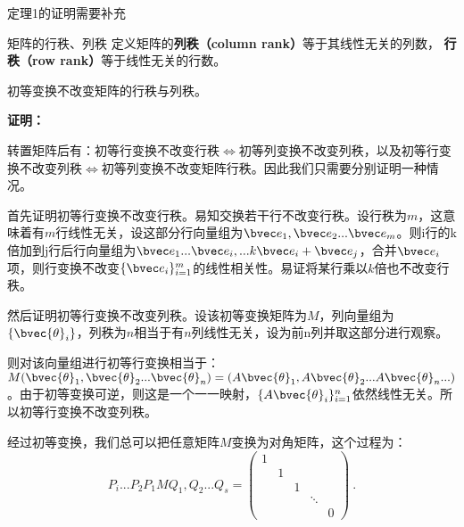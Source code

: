
\begin{issues}
\issueDraft 定理1的证明需要补充
\end{issues}


\begin{definition}{矩阵的行秩、列秩}
定义矩阵的\textbf{列秩（column rank）}等于其线性无关的列数， \textbf{行秩（row rank）}等于线性无关的行数。
\end{definition}
\begin{theorem}{}
初等变换不改变矩阵的行秩与列秩。
\end{theorem}
\textbf{证明：}

转置矩阵后有：初等行变换不改变行秩$\Leftrightarrow$初等列变换不改变列秩，以及初等行变换不改变列秩$\Leftrightarrow$初等列变换不改变矩阵行秩。因此我们只需要分别证明一种情况。

首先证明初等行变换不改变行秩。易知交换若干行不改变行秩。设行秩为$m$，这意味着有$m$行线性无关，设这部分行向量组为$\bvec e_1,\bvec e_2...\bvec e_m$。则i行的k倍加到j行后行向量组为$\bvec e_1...\bvec e_i,...k\bvec e_i+\bvec e_j$，合并$\bvec e_i$项，则行变换不改变$\{\bvec e_i\}^m_{i=1}$的线性相关性。易证将某行乘以$k$倍也不改变行秩。

然后证明初等行变换不改变列秩。设该初等变换矩阵为$M$，列向量组为$\{\bvec{\theta}_i\}$，列秩为$n$相当于有$n$列线性无关，设为前n列并取这部分进行观察。

则对该向量组进行初等行变换相当于：$M(\bvec{\theta}_1,\bvec{\theta}_2...\bvec{\theta}_n)=(A\bvec{\theta}_1,A\bvec{\theta}_2...A\bvec{\theta}_n...)$。由于初等变换可逆，则这是一个一一映射，$\{A\bvec{\theta}_i\}_{i=1}^n$依然线性无关。所以初等行变换不改变列秩。

经过初等变换，我们总可以把任意矩阵$M$变换为对角矩阵，这个过程为：
\begin{equation}\label{eq_MatRnk_2}
P_i...P_2P_1MQ_1,Q_2...Q_s=
\left(\begin{array}{lllll}
1 & & & & \\
& 1 & & & \\
& & 1 & & \\
& & & \ddots & \\
& & & & 0
\end{array}\right)~.
\end{equation}



